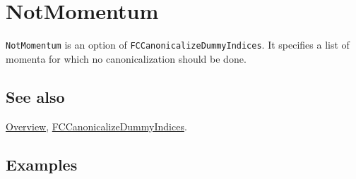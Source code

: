 \documentclass[../FeynCalcManual.tex]{subfiles}
\begin{document}
\hypertarget{notmomentum}{%
\section{NotMomentum}\label{notmomentum}}

\texttt{NotMomentum} is an option of
\texttt{FCCanonicalizeDummyIndices}. It specifies a list of momenta for
which no canonicalization should be done.

\subsection{See also}

\hyperlink{toc}{Overview},
\hyperlink{fccanonicalizedummyindices}{FCCanonicalizeDummyIndices}.

\subsection{Examples}
\end{document}
